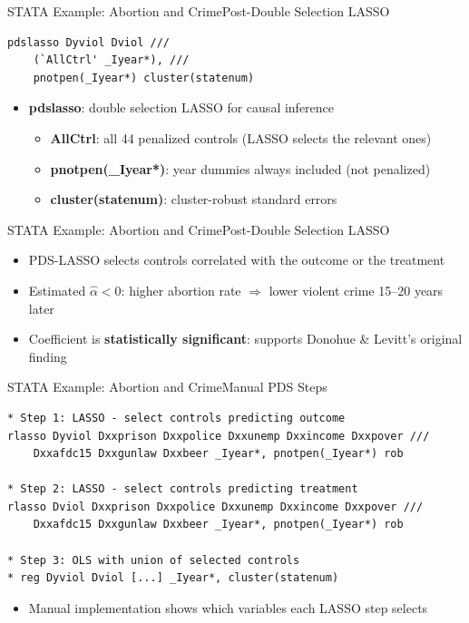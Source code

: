 \documentclass[hyperref={pdfpagelabels=false}]{beamer}
\begin{document}
\begin{frame}[fragile]{STATA Example: Abortion and Crime}{Post-Double Selection LASSO}
\begin{lstlisting}
pdslasso Dyviol Dviol ///
    (`AllCtrl' _Iyear*), ///
    pnotpen(_Iyear*) cluster(statenum)
\end{lstlisting}
\begin{itemize}
	\item \textbf{pdslasso}: double selection LASSO for causal inference
	\vspace{0.2cm}
	\begin{itemize}
		\item \textbf{AllCtrl}: all 44 penalized controls (LASSO selects the relevant ones)
		\vspace{0.2cm}
		\item \textbf{pnotpen(\_Iyear*)}: year dummies always included (not penalized)
		\vspace{0.2cm}
		\item \textbf{cluster(statenum)}: cluster-robust standard errors
	\end{itemize}
\end{itemize}
\end{frame}



\begin{frame}[fragile]{STATA Example: Abortion and Crime}{Post-Double Selection LASSO}
\begin{itemize}
\normalsize
\item PDS-LASSO selects controls correlated with the outcome or the treatment
\vspace{0.2cm}
\item Estimated $\hat{\alpha} < 0$: higher abortion rate $\Rightarrow$ lower violent crime 15--20 years later
\vspace{0.2cm}
\item Coefficient is \textbf{statistically significant}: supports Donohue \& Levitt's original finding
\end{itemize}
\end{frame}



\begin{frame}[fragile]{STATA Example: Abortion and Crime}{Manual PDS Steps}
\begin{lstlisting}
* Step 1: LASSO - select controls predicting outcome
rlasso Dyviol Dxxprison Dxxpolice Dxxunemp Dxxincome Dxxpover ///
    Dxxafdc15 Dxxgunlaw Dxxbeer _Iyear*, pnotpen(_Iyear*) rob

* Step 2: LASSO - select controls predicting treatment
rlasso Dviol Dxxprison Dxxpolice Dxxunemp Dxxincome Dxxpover ///
    Dxxafdc15 Dxxgunlaw Dxxbeer _Iyear*, pnotpen(_Iyear*) rob

* Step 3: OLS with union of selected controls
* reg Dyviol Dviol [...] _Iyear*, cluster(statenum)
\end{lstlisting}
\begin{itemize}
	\item Manual implementation shows which variables each LASSO step selects
\end{itemize}
\end{frame}
\end{document}
